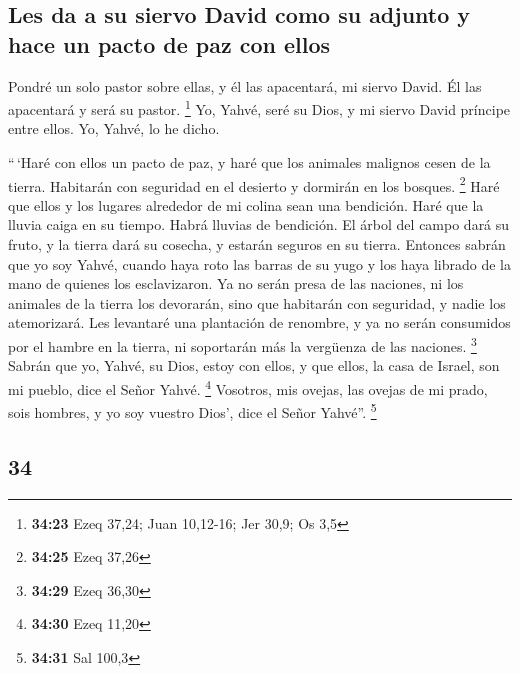 \begin{paracol}{2}
\hypertarget{les-da-a-su-siervo-david-como-su-adjunto-y-hace-un-pacto-de-paz-con-ellos}{%
\subsection{Les da a su siervo David como su adjunto y hace un pacto de
paz con
ellos}\label{les-da-a-su-siervo-david-como-su-adjunto-y-hace-un-pacto-de-paz-con-ellos}}

 Pondré un solo pastor sobre ellas, y él las apacentará,
mi siervo David. Él las apacentará y será su pastor. \footnote{\textbf{34:23}
  Ezeq 37,24; Juan 10,12-16; Jer 30,9; Os 3,5}  Yo,
Yahvé, seré su Dios, y mi siervo David príncipe entre ellos. Yo, Yahvé,
lo he dicho.

 ``\,`Haré con ellos un pacto de paz, y haré que los
animales malignos cesen de la tierra. Habitarán con seguridad en el
desierto y dormirán en los bosques. \footnote{\textbf{34:25} Ezeq 37,26}
 Haré que ellos y los lugares alrededor de mi colina sean
una bendición. Haré que la lluvia caiga en su tiempo. Habrá lluvias de
bendición.  El árbol del campo dará su fruto, y la tierra
dará su cosecha, y estarán seguros en su tierra. Entonces sabrán que yo
soy Yahvé, cuando haya roto las barras de su yugo y los haya librado de
la mano de quienes los esclavizaron.  Ya no serán presa
de las naciones, ni los animales de la tierra los devorarán, sino que
habitarán con seguridad, y nadie los atemorizará.  Les
levantaré una plantación de renombre, y ya no serán consumidos por el
hambre en la tierra, ni soportarán más la vergüenza de las naciones.
\footnote{\textbf{34:29} Ezeq 36,30}  Sabrán que yo,
Yahvé, su Dios, estoy con ellos, y que ellos, la casa de Israel, son mi
pueblo, dice el Señor Yahvé. \footnote{\textbf{34:30} Ezeq 11,20}
 Vosotros, mis ovejas, las ovejas de mi prado, sois
hombres, y yo soy vuestro Dios', dice el Señor Yahvé''. \footnote{\textbf{34:31}
  Sal 100,3}

\switchcolumn
\begin{otherlanguage}{english}

\hypertarget{section-67}{%
\section{34}\label{section-67}}


\end{otherlanguage}
\end{paracol}
